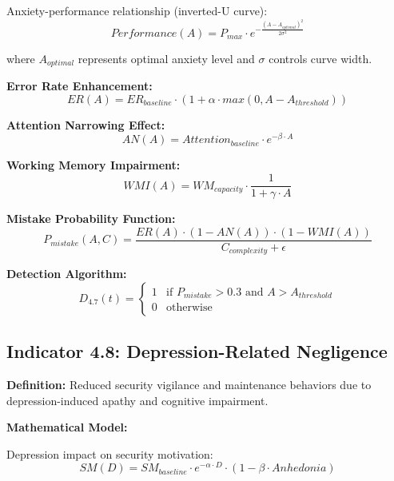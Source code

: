 \documentclass[11pt,a4paper]{article}
\begin{document}
Anxiety-performance relationship (inverted-U curve):
\begin{equation}
Performance(A) = P_{max} \cdot e^{-\frac{(A - A_{optimal})^2}{2\sigma^2}}
\end{equation}

where $A_{optimal}$ represents optimal anxiety level and $\sigma$ controls curve width.

\textbf{Error Rate Enhancement:}
\begin{equation}
ER(A) = ER_{baseline} \cdot \left(1 + \alpha \cdot max(0, A - A_{threshold})\right)
\end{equation}

\textbf{Attention Narrowing Effect:}
\begin{equation}
AN(A) = Attention_{baseline} \cdot e^{-\beta \cdot A}
\end{equation}

\textbf{Working Memory Impairment:}
\begin{equation}
WMI(A) = WM_{capacity} \cdot \frac{1}{1 + \gamma \cdot A}
\end{equation}

\textbf{Mistake Probability Function:}
\begin{equation}
P_{mistake}(A,C) = \frac{ER(A) \cdot (1 - AN(A)) \cdot (1 - WMI(A))}{C_{complexity} + \epsilon}
\end{equation}

\textbf{Detection Algorithm:}
\begin{equation}
D_{4.7}(t) = \begin{cases}
1 & \text{if } P_{mistake} > 0.3 \text{ and } A > A_{threshold} \\
0 & \text{otherwise}
\end{cases}
\end{equation}

\subsection{Indicator 4.8: Depression-Related Negligence}

\textbf{Definition:} Reduced security vigilance and maintenance behaviors due to depression-induced apathy and cognitive impairment.

\textbf{Mathematical Model:}

Depression impact on security motivation:
\begin{equation}
SM(D) = SM_{baseline} \cdot e^{-\alpha \cdot D} \cdot (1 - \beta \cdot Anhedonia)
\end{equation}
\end{document}
